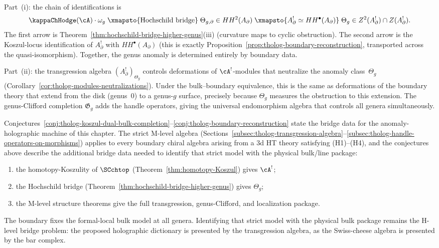 \begin{remark}
Part~(i): the chain of identifications is
\[
\kappaChHodge(\cA) \cdot \omega_g
\;\xmapsto{\text{Hochschild bridge}}\;
\Theta_{g,\partial} \in HH^2(A_\partial)
\;\xmapsto{A_\partial^! \simeq HH^\bullet(A_\partial)}\;
\Theta_g \in Z^2(A_\partial^!) \cap Z(A_\partial^!).
\]
The first arrow is
Theorem~\ref{thm:hochschild-bridge-higher-genus}(iii) (curvature
maps to cyclic obstruction). The second arrow is the
Koszul-locus identification of \(A_\partial^!\) with
\(HH^\bullet(A_\partial)\) (this is exactly
Proposition~\ref{prop:tholog-boundary-reconstruction},
transported across the quasi-isomorphism). Together, the
genus anomaly is determined entirely by boundary data.

Part~(ii): the transgression algebra
\((A_\partial^!)_{\Theta_g}\) controls deformations of
\(\cA^!\)-modules that neutralize the anomaly class~\(\Theta_g\)
(Corollary~\ref{cor:tholog-modules-neutralizations}). Under the
bulk--boundary equivalence, this is the same as deformations of
the boundary theory that extend from the disk (genus~$0$) to a
genus-\(g\) surface, precisely because $\Theta_g$ measures the
obstruction to this extension. The genus-Clifford completion
\(\mathfrak{G}_g\) adds the handle operators, giving the
universal endomorphism algebra that controls all genera
simultaneously.
\end{remark}

\begin{remark}
Conjectures~\ref{conj:tholog-koszul-dual-bulk-completion}--\ref{conj:tholog-boundary-reconstruction}
state the bridge data for the anomaly-holographic machine of this chapter.
The strict M-level algebra
(Sections~\ref{subsec:tholog-transgression-algebra}--\ref{subsec:tholog-handle-operators-on-morphisms})
applies to every boundary chiral algebra arising from a 3d HT
theory satisfying (H1)--(H4), and the conjectures above describe
the additional bridge data needed to identify that strict model
with the physical bulk/line package:
\begin{enumerate}[label=\textup{(\alph*)}]
\item the homotopy-Koszulity of \(\SCchtop\)
 (Theorem~\ref{thm:homotopy-Koszul}) gives \(\cA^!\);
\item the Hochschild bridge
 (Theorem~\ref{thm:hochschild-bridge-higher-genus}) gives
 \(\Theta_g\);
\item the M-level structure theorems give the full transgression,
 genus-Clifford, and localization package.
\end{enumerate}
The boundary fixes the formal-local bulk model at all genera.
Identifying that strict model with the physical bulk package
remains the H-level bridge problem: the proposed holographic
dictionary is presented by the transgression algebra, as the
Swiss-cheese algebra is presented by the bar complex.
\end{remark}

